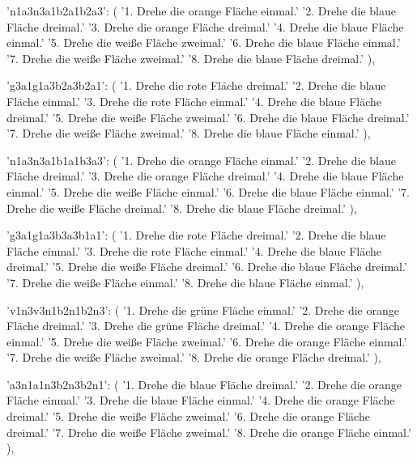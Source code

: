 {{        'n1a3n3a1b2a1b2a3': (
            '1. Drehe die orange Fläche einmal.\n'
            '2. Drehe die blaue Fläche dreimal.\n'
            '3. Drehe die orange Fläche dreimal.\n'
            '4. Drehe die blaue Fläche einmal.\n'
            '5. Drehe die weiße Fläche zweimal.\n'
            '6. Drehe die blaue Fläche einmal.\n'
            '7. Drehe die weiße Fläche zweimal.\n'
            '8. Drehe die blaue Fläche dreimal.'
        ),

        'g3a1g1a3b2a3b2a1': (
            '1. Drehe die rote Fläche dreimal.\n'
            '2. Drehe die blaue Fläche einmal.\n'
            '3. Drehe die rote Fläche einmal.\n'
            '4. Drehe die blaue Fläche dreimal.\n'
            '5. Drehe die weiße Fläche zweimal.\n'
            '6. Drehe die blaue Fläche dreimal.\n'
            '7. Drehe die weiße Fläche zweimal.\n'
            '8. Drehe die blaue Fläche einmal.'
        ),

        'n1a3n3a1b1a1b3a3': (
            '1. Drehe die orange Fläche einmal.\n'
            '2. Drehe die blaue Fläche dreimal.\n'
            '3. Drehe die orange Fläche dreimal.\n'
            '4. Drehe die blaue Fläche einmal.\n'
            '5. Drehe die weiße Fläche einmal.\n'
            '6. Drehe die blaue Fläche einmal.\n'
            '7. Drehe die weiße Fläche dreimal.\n'
            '8. Drehe die blaue Fläche dreimal.'
        ),

        'g3a1g1a3b3a3b1a1': (
            '1. Drehe die rote Fläche dreimal.\n'
            '2. Drehe die blaue Fläche einmal.\n'
            '3. Drehe die rote Fläche einmal.\n'
            '4. Drehe die blaue Fläche dreimal.\n'
            '5. Drehe die weiße Fläche dreimal.\n'
            '6. Drehe die blaue Fläche dreimal.\n'
            '7. Drehe die weiße Fläche einmal.\n'
            '8. Drehe die blaue Fläche einmal.'
        ),

        'v1n3v3n1b2n1b2n3': (
            '1. Drehe die grüne Fläche einmal.\n'
            '2. Drehe die orange Fläche dreimal.\n'
            '3. Drehe die grüne Fläche dreimal.\n'
            '4. Drehe die orange Fläche einmal.\n'
            '5. Drehe die weiße Fläche zweimal.\n'
            '6. Drehe die orange Fläche einmal.\n'
            '7. Drehe die weiße Fläche zweimal.\n'
            '8. Drehe die orange Fläche dreimal.'
        ),

        'a3n1a1n3b2n3b2n1': (
            '1. Drehe die blaue Fläche dreimal.\n'
            '2. Drehe die orange Fläche einmal.\n'
            '3. Drehe die blaue Fläche einmal.\n'
            '4. Drehe die orange Fläche dreimal.\n'
            '5. Drehe die weiße Fläche zweimal.\n'
            '6. Drehe die orange Fläche dreimal.\n'
            '7. Drehe die weiße Fläche zweimal.\n'
            '8. Drehe die orange Fläche einmal.'
        ),

}}
